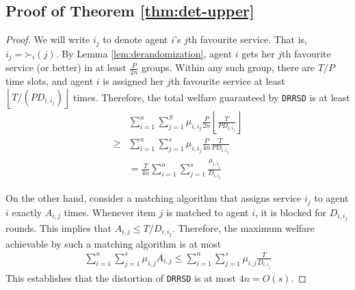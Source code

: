 \documentclass[letterpaper,11pt]{article}
\begin{document}
\subsection{Proof of Theorem \ref{thm:det-upper}}
\begin{proof}
We will write $i_j$ to denote agent $i$'s $j$th favourite service. That is, $i_{j} = \mathord\succ_{i}(j)$. By Lemma \ref{lem:derandomization}, agent $i$ gets her $j$th favourite service (or better) in at least $\frac{P}{2n}$ groups. Within any such group,  there are $T/P$ time slots, and agent $i$ is assigned her $j$th favourite service at least $\left \lfloor T/(PD_{i,i_j}) \right \rfloor$ times. Therefore, the total welfare guaranteed by \texttt{DRRSD} is at least
\begin{align*}
&\sum_{i=1}^n \sum_{j=1}^S \mu_{i,i_j} \frac{P}{2n} \left \lfloor \frac{T}{PD_{i,i_j}} \right \rfloor\\ \ge &\sum_{i=1}^n \sum_{j=1}^s \mu_{i, i_j}\frac{P}{4n}  \frac{T}{PD_{i,i_j}} \\ &= \frac{T}{4n} \sum_{i=1}^n \sum_{j=1}^s \frac{\mu_{i, i_j}}{D_{i,i_j}}
\end{align*}

On the other hand, consider a matching algorithm that assigns service $i_j$ to agent $i$ exactly $A_{i,j}$ times. Whenever item $j$ is matched to agent $i$, it is blocked for $D_{i,i_j}$ rounds. This implies that $A_{i,j} \le T/D_{i,i_j}$. Therefore, the maximum welfare achievable by such a matching algorithm is at most
    \begin{align*}
        \sum_{i=1}^n \sum_{j=1}^s \mu_{i, j} A_{i,j} \le \sum_{i=1}^n \sum_{j=1}^s \mu_{i,j} \frac{T}{D_{i,i_j}}
    \end{align*}
    This establishes that the distortion of \texttt{DRRSD} is at most $4n = O(s)$.
\end{proof}
\end{document}
